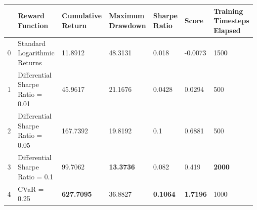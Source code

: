 \begin{tabular}{lllllll}
\toprule
 & Reward Function & Cumulative Return & Maximum Drawdown & Sharpe Ratio & Score & Training Timesteps Elapsed \\
\midrule
0 & Standard Logarithmic Returns & 11.8912 & 48.3131 & 0.018 & -0.0073 & 1500 \\
1 & Differential Sharpe Ratio = 0.01 & 45.9617 & 21.1676 & 0.0428 & 0.0294 & 500 \\
2 & Differential Sharpe Ratio = 0.05 & 167.7392 & 19.8192 & 0.1 & 0.6881 & 500 \\
3 & Differential Sharpe Ratio = 0.1 & 99.7062 & \textbf{13.3736} & 0.082 & 0.419 & \textbf{2000} \\
4 & CVaR = 0.25 & \textbf{627.7095} & 36.8827 & \textbf{0.1064} & \textbf{1.7196} & 1000 \\
\bottomrule
\end{tabular}
